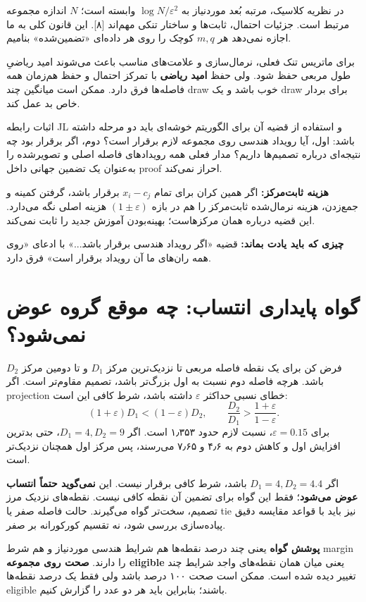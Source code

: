\documentclass[11pt,a4paper]{article}
\newcommand{\lesson}[1]{\clearpage\section{#1}}
\newcommand{\takeaway}[1]{\par\textbf{چیزی که باید یادت بماند:} #1\par}
\begin{document}
در نظریه کلاسیک، مرتبه بُعد موردنیاز به \(\log N/\varepsilon^2\) وابسته است؛ \(N\) اندازه مجموعه مرتبط است. جزئیات احتمال، ثابت‌ها و ساختار تنکی مهم‌اند [۸]. این قانون کلی به ما اجازه نمی‌دهد هر \(m,q\) کوچک را روی هر داده‌ای «تضمین‌شده» بنامیم.

برای ماتریس تنک فعلی، نرمال‌سازی و علامت‌های مناسب باعث می‌شوند امید ریاضیِ طول مربعی حفظ شود. ولی حفظ \textbf{امید ریاضی} با تمرکز احتمال و حفظ هم‌زمان همه فاصله‌ها فرق دارد. ممکن است میانگین چند draw خوب باشد و یک draw برای بردار خاص بد عمل کند.

اثبات رابطه JL و استفاده از قضیه آن برای الگوریتم خوشه‌ای باید دو مرحله داشته باشد: اول، آیا رویداد هندسی روی مجموعه لازم برقرار است؟ دوم، اگر برقرار بود چه نتیجه‌ای درباره تصمیم‌ها داریم؟ مدار فعلی همه رویدادهای فاصله اصلی و تصویرشده را به‌عنوان یک تضمین جهانی داخل proof احراز نمی‌کند.

\textbf{هزینه ثابت‌مرکز:} اگر همین کران برای تمام \(x_i-c_j\) برقرار باشد، گرفتن کمینه و جمع‌زدن، هزینه نرمال‌شده ثابت‌مرکز را هم در بازه \((1\pm\varepsilon)\) هزینه اصلی نگه می‌دارد. این قضیه درباره همان مرکزهاست؛ بهینه‌بودن آموزش جدید را ثابت نمی‌کند.

\takeaway{قضیه «اگر رویداد هندسی برقرار باشد...» با ادعای «روی همه ران‌های ما آن رویداد برقرار است» فرق دارد.}

\lesson{گواه پایداری انتساب: چه موقع گروه عوض نمی‌شود؟}
فرض کن برای یک نقطه فاصله مربعی تا نزدیک‌ترین مرکز \(D_1\) و تا دومین مرکز \(D_2\) باشد. هرچه فاصله دوم نسبت به اول بزرگ‌تر باشد، تصمیم مقاوم‌تر است. اگر projection خطای نسبی حداکثر \(\varepsilon\) داشته باشد، شرط کافی این است:
\[
 (1+\varepsilon)D_1<(1-\varepsilon)D_2,
 \qquad \frac{D_2}{D_1}>\frac{1+\varepsilon}{1-\varepsilon}.
\]
برای \(\varepsilon=0.15\)، نسبت لازم حدود ۱٫۳۵۳ است. اگر \(D_1=4,D_2=9\)، حتی بدترین افزایش اول و کاهش دوم به ۴٫۶ و ۷٫۶۵ می‌رسند، پس مرکز اول همچنان نزدیک‌تر است.

اگر \(D_1=4,D_2=4.4\) باشد، شرط کافی برقرار نیست. این \textbf{نمی‌گوید حتماً انتساب عوض می‌شود}؛ فقط این گواه برای تضمین آن نقطه کافی نیست. نقطه‌های نزدیک مرز تصمیم، سخت‌تر گواه می‌گیرند. حالت فاصله صفر یا tie نیز باید با قواعد مقایسه دقیق پیاده‌سازی بررسی شود، نه تقسیم کورکورانه بر صفر.

\textbf{پوشش گواه} یعنی چند درصد نقطه‌ها هم شرایط هندسی موردنیاز و هم شرط margin را دارند. \textbf{صحت روی مجموعه eligible} یعنی میان همان نقطه‌های واجد شرایط چند تغییر دیده شده است. ممکن است صحت ۱۰۰ درصد باشد ولی فقط یک درصد نقطه‌ها eligible باشند؛ بنابراین باید هر دو عدد را گزارش کنیم.
\end{document}
